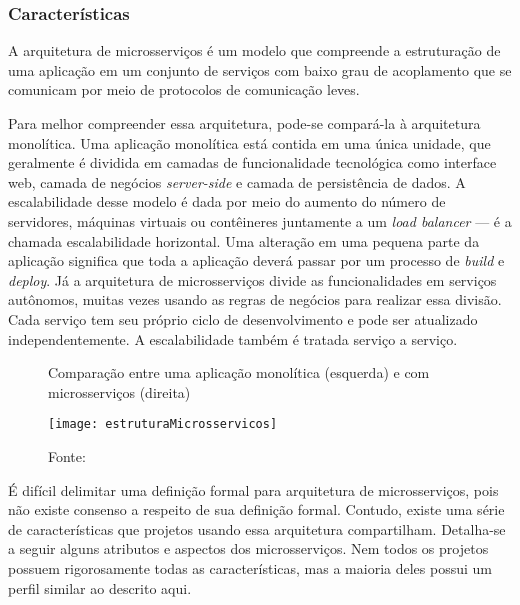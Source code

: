 \subsubsection{Características}
A arquitetura de microsserviços é um modelo que compreende a estruturação de uma aplicação em um conjunto de serviços com baixo grau de acoplamento que se comunicam por meio de protocolos de comunicação leves.

Para melhor compreender essa arquitetura, pode-se compará-la à arquitetura monolítica. Uma aplicação monolítica está contida em uma única unidade, que geralmente é dividida em camadas de funcionalidade tecnológica como interface web, camada de negócios \emph{server-side} e camada de persistência de dados. A escalabilidade desse modelo é dada por meio do aumento do número de servidores, máquinas virtuais ou contêineres juntamente a um \emph{load balancer} --- é a chamada escalabilidade horizontal. Uma alteração em uma pequena parte da aplicação significa que toda a aplicação deverá passar por um processo de \textit{build} e \textit{deploy}. Já a arquitetura de microsserviços divide as funcionalidades em serviços autônomos, muitas vezes usando as regras de negócios para realizar essa divisão. Cada serviço tem seu próprio ciclo de desenvolvimento e pode ser atualizado independentemente. A escalabilidade também é tratada serviço a serviço.

\begin{figure}[H]
	\centering
	\caption{Comparação entre uma aplicação monolítica (esquerda) e com microsserviços (direita)}
  \texttt{[image: estruturaMicrosservicos]}
	\caption*{Fonte: \cite{lewis}}
\label{fig:estruturaMicrosservicos}
\end{figure}

É difícil delimitar uma definição formal para arquitetura de microsserviços, pois não existe consenso a respeito de sua definição formal. Contudo, existe uma série de características que projetos usando essa arquitetura compartilham. Detalha-se a seguir alguns atributos e aspectos dos microsserviços. Nem todos os projetos possuem rigorosamente todas as características, mas a maioria deles possui um perfil similar ao descrito aqui.

